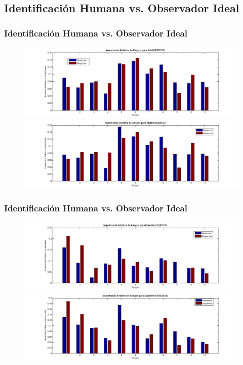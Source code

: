 \documentclass[10pt]{beamer}
\begin{document}
      \subsection{Identificaci\'on Humana vs. Observador Ideal}
 	\begin{frame}
	\frametitle{Identificaci\'on Humana vs. Observador Ideal}
	    \begin{figure}
		\includegraphics[width=\textwidth]{graficos/importanciaRelativa_Arial.png}\\
		\includegraphics[width=\textwidth]{graficos/importanciaRelativa_Arial_ideal.png}
	    \end{figure}
	\end{frame}

 	\begin{frame}
	\frametitle{Identificaci\'on Humana vs. Observador Ideal}
	    \begin{figure}
		\includegraphics[width=\textwidth]{graficos/importanciaRelativa_Kunstler.png}\\
		\includegraphics[width=\textwidth]{graficos/importanciaRelativa_Kunstler_ideal.png}
	    \end{figure}
	\end{frame}
\end{document}
